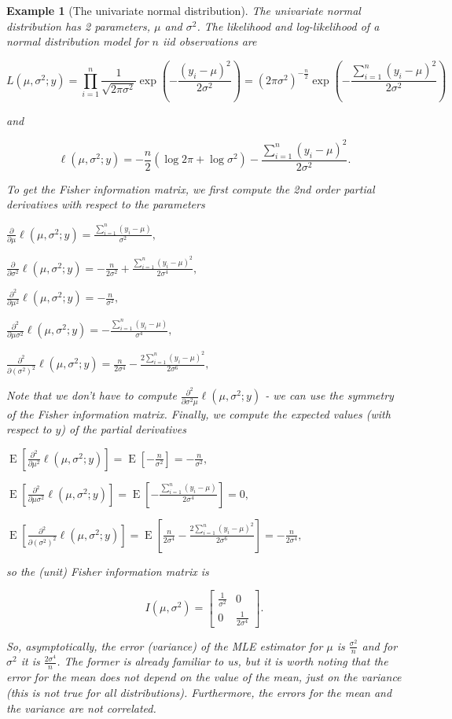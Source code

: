 \documentclass{book}
\theoremstyle{plain}%
\newtheorem{prototheorem}{Example}[section]
\newenvironment{cexample}
   {\colorlet{shadecolor}{gray!10}\begin{shaded}\begin{prototheorem}}
   {\end{prototheorem}\end{shaded}}
\theoremstyle{definition}
\DeclareMathOperator{\E}{E}
\begin{document}
\begin{cexample}[The univariate normal distribution] The univariate normal distribution has 2 parameters, $\mu$ and $\sigma^2$. The likelihood and log-likelihood of a normal distribution model for $n$ iid observations are

$$L(\mu, \sigma^2; y) = \prod_{i=1}^n \frac{1}{\sqrt{2\pi\sigma^2}} \exp(-\frac{(y_i - \mu)^2}{2\sigma^2}) = (2\pi\sigma^2)^{-\frac{n}{2}} \exp(-\frac{\sum_{i=1}^n(y_i - \mu)^2}{2\sigma^2})$$

and

$$\ell(\mu, \sigma^2; y) = -\frac{n}{2}(\log 2\pi + \log \sigma^2) - \frac{\sum_{i=1}^n(y_i - \mu)^2}{2\sigma^2}.$$

To get the Fisher information matrix, we first compute the 2nd order partial derivatives with respect to the parameters

$\frac{\partial}{\partial \mu} \ell(\mu, \sigma^2; y) = \frac{\sum_{i=1}^n(y_i - \mu)}{\sigma^2},$

$\frac{\partial}{\partial \sigma^2} \ell(\mu, \sigma^2; y) = -\frac{n}{2\sigma^2}+ \frac{\sum_{i=1}^n(y_i - \mu)^2}{2\sigma^4},$

$\frac{\partial^2}{\partial \mu^2} \ell(\mu, \sigma^2; y) = -\frac{n}{\sigma^2},$

$\frac{\partial^2}{\partial \mu\sigma^2} \ell(\mu, \sigma^2; y) = -\frac{\sum_{i=1}^n(y_i - \mu)}{\sigma^4},$

$\frac{\partial^2}{\partial (\sigma^2)^2} \ell(\mu, \sigma^2; y) = \frac{n}{2\sigma^4}- \frac{2\sum_{i=1}^n(y_i - \mu)^2}{2\sigma^6},$

Note that we don't have to compute  $\frac{\partial^2}{\partial \sigma^2\mu} \ell(\mu, \sigma^2; y)$ - we can use the symmetry of the Fisher information matrix. Finally, we compute the expected values (with respect to $y$) of the partial derivatives

$\E[\frac{\partial^2}{\partial \mu^2} \ell(\mu, \sigma^2; y)] = \E[-\frac{n}{\sigma^2}] = -\frac{n}{\sigma^2},$

$\E[\frac{\partial^2}{\partial \mu\sigma^2} \ell(\mu, \sigma^2; y)] = \E[-\frac{\sum_{i=1}^n(y_i - \mu)}{2\sigma^4}] = 0,$

$\E[\frac{\partial^2}{\partial (\sigma^2)^2} \ell(\mu, \sigma^2; y)] = \E[\frac{n}{2\sigma^4}- \frac{2\sum_{i=1}^n(y_i - \mu)^2}{2\sigma^6}] = -\frac{n}{2\sigma^4},$

so the (unit) Fisher information matrix is

$$I(\mu, \sigma^2) = \begin{bmatrix}\frac{1}{\sigma^2} & 0 \\ 0 & \frac{1}{2\sigma^4}\end{bmatrix}.$$

So, asymptotically, the error (variance) of the MLE estimator for $\mu$ is $\frac{\sigma^2}{n}$ and for $\sigma^2$ it is $\frac{2\sigma^4}{n}$. The former is already familiar to us, but it is worth noting that the error for the mean does not depend on the value of the mean, just on the variance (this is not true for all distributions). Furthermore, the errors for the mean and the variance are not correlated.
\end{cexample}
\end{document}
